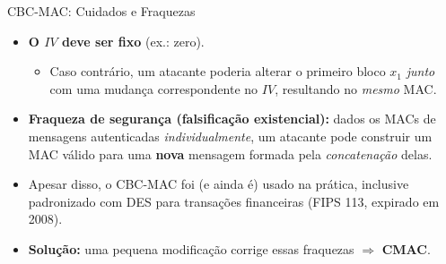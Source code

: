 \documentclass{beamer}
\begin{document}
\begin{frame}{CBC-MAC: Cuidados e Fraquezas}
    \begin{itemize}
        \item \textbf{O $IV$ deve ser fixo} (ex.: zero).
        \begin{itemize}
            \footnotesize
            \item Caso contrário, um atacante poderia alterar o primeiro bloco $x_1$ \emph{junto} com uma mudança correspondente no $IV$, resultando no \emph{mesmo} MAC.
        \end{itemize}
        \bigskip
        \item \textbf{Fraqueza de segurança (falsificação existencial):} dados os MACs de mensagens autenticadas \emph{individualmente}, um atacante pode construir um MAC válido para uma \textbf{nova} mensagem formada pela \emph{concatenação} delas.
        \bigskip
        \item Apesar disso, o CBC-MAC foi (e ainda é) usado na prática, inclusive padronizado com DES para transações financeiras (FIPS 113, expirado em 2008).
        \bigskip\pause
        \item \textbf{Solução:} uma pequena modificação corrige essas fraquezas $\Rightarrow$ \textbf{CMAC}.
    \end{itemize}
\end{frame}
\end{document}
